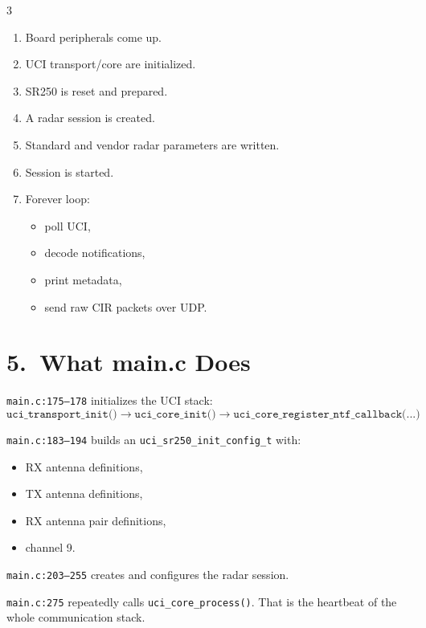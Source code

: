 \documentclass[10pt]{article}
\begin{document}
\begin{multicols*}{3}
\medskip
\begin{tcolorbox}[summarybox={Runtime Story}]
\begin{enumerate}
  \item Board peripherals come up.
  \item UCI transport/core are initialized.
  \item SR250 is reset and prepared.
  \item A radar session is created.
  \item Standard and vendor radar parameters are written.
  \item Session is started.
  \item Forever loop:
  \begin{itemize}
    \item poll UCI,
    \item decode notifications,
    \item print metadata,
    \item send raw CIR packets over UDP.
  \end{itemize}
\end{enumerate}
\end{tcolorbox}

\section*{5.\ What main.c Does}

\texttt{main.c:175--178} initializes the UCI stack:
\[
\texttt{uci\_transport\_init()}
\rightarrow
\texttt{uci\_core\_init()}
\rightarrow
\texttt{uci\_core\_register\_ntf\_callback(...)}
\]

\texttt{main.c:183--194} builds an \texttt{uci\_sr250\_init\_config\_t} with:
\begin{itemize}
  \item RX antenna definitions,
  \item TX antenna definitions,
  \item RX antenna pair definitions,
  \item channel 9.
\end{itemize}

\texttt{main.c:203--255} creates and configures the radar session.

\texttt{main.c:275} repeatedly calls \texttt{uci\_core\_process()}.
That is the heartbeat of the whole communication stack.


\end{multicols*}
\end{document}
